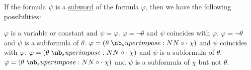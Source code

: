 \begin{lemma}\label{thm:propositional_subformula_lemma}
  If the formula \( \psi \) is a \hyperref[def:formal_language/subword]{subword} of the formula \( \varphi \), then we have the following possibilities:
  \begin{thmenum}
     \( \varphi \) is a variable or constant and \( \psi = \varphi \).
     \( \varphi = \neg \theta \) and \( \psi \) coincides with \( \varphi \).
     \( \varphi = \neg \theta \) and \( \psi \) is a subformula of \( \theta \).
     \( \varphi = (\theta \syncirc \chi) \) and \( \psi \) coincides with \( \varphi \).
     \( \varphi = (\theta \syncirc \chi) \) and \( \psi \) is a subformula of \( \theta \).
     \( \varphi = (\theta \syncirc \chi) \) and \( \psi \) is a subformula of \( \chi \) but not \( \theta \).
  \end{thmenum}
\end{lemma}
